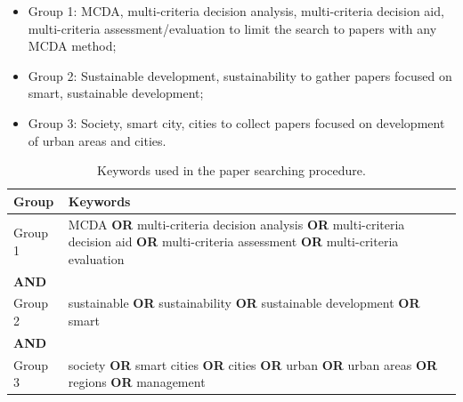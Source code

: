 \documentclass[5p,times]{elsarticle}
\begin{document}
\begin{itemize}
    \item {Group 1: MCDA, multi-criteria decision analysis, multi-criteria decision aid, multi-criteria assessment/evaluation to limit the search to papers with any MCDA method;}
    \item {Group 2: Sustainable development, sustainability to gather papers focused on smart, sustainable development;}
    \item {Group 3: Society, smart city, cities to collect papers focused on development of urban areas and cities.}
\end{itemize}

\begin{table}[H]
\centering
\caption{Keywords used in the paper searching procedure.}
\label{tab:prismakeywords}
\begin{tabular}{lp{5cm}} \toprule
Group & Keywords \\ \midrule
Group 1 & MCDA \textbf{OR} multi-criteria decision analysis \textbf{OR} multi-criteria decision aid \textbf{OR} multi-criteria assessment \textbf{OR} multi-criteria evaluation \\
\textbf{AND} &  \\
Group 2 & sustainable \textbf{OR} sustainability \textbf{OR} sustainable development \textbf{OR} smart \\
\textbf{AND} &  \\
Group 3 & society \textbf{OR} smart cities \textbf{OR} cities \textbf{OR} urban \textbf{OR} urban areas \textbf{OR} regions \textbf{OR} management \\ \bottomrule
\end{tabular}
\end{table}
\end{document}
